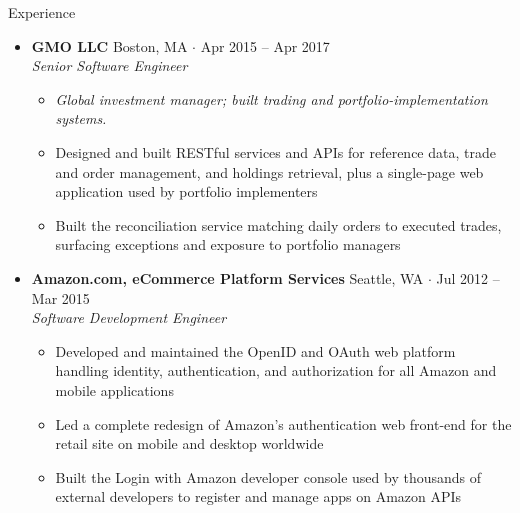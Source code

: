 \documentclass[10pt,oneside]{article}
\newenvironment{ressection}[1]{
  \vspace{4pt}
  {\fontfamily{phv}\selectfont\Large#1}
  \begin{itemize}
    \vspace{3pt}
}{
  \end{itemize}
}
\newcommand{\ressubitem}[1]{
  \vspace{-1pt}
\item \begin{flushleft} #1 \end{flushleft}
}
\newcommand{\rescontext}[1]{
  \vspace{-3pt}
\item[] \begin{flushleft} \textit{\small #1} \end{flushleft}
}
\newcommand{\resbigitem}[3]{
  \vspace{-5pt}
\item
  \textbf{#1} \hfill #2 \\
  \textit{#3}
}
\newenvironment{ressubsec}[3]{
  \resbigitem{#1}{#2}{#3}
  \vspace{-2pt}
  \begin{itemize}
}{
  \end{itemize}
}
\begin{document}
\begin{ressection}{Experience}
  \begin{ressubsec}{GMO LLC}{Boston, MA \; $\cdot$ \; Apr 2015 -- Apr 2017}{Senior Software Engineer}
    \rescontext{Global investment manager; built trading and portfolio-implementation systems.}
    \ressubitem{Designed and built RESTful services and APIs for reference data, trade and order management, and holdings retrieval, plus a single-page web application used by portfolio implementers}
    \ressubitem{Built the reconciliation service matching daily orders to executed trades, surfacing exceptions and exposure to portfolio managers}
  \end{ressubsec}

  \begin{ressubsec}{Amazon.com, eCommerce Platform Services}{Seattle, WA \; $\cdot$ \; Jul 2012 -- Mar 2015}{Software Development Engineer}
    \ressubitem{Developed and maintained the OpenID and OAuth web platform handling identity, authentication, and authorization for all Amazon and mobile applications}
    \ressubitem{Led a complete redesign of Amazon's authentication web front-end for the retail site on mobile and desktop worldwide}
    \ressubitem{Built the Login with Amazon developer console used by thousands of external developers to register and manage apps on Amazon APIs}
  \end{ressubsec}

\end{ressection}
\end{document}
